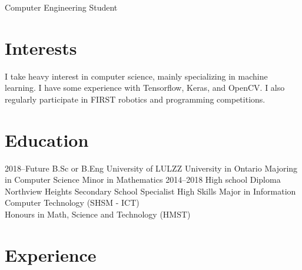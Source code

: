 \documentclass[]{chandan-cv}
\begin{document}
       {Computer Engineering Student}



\section{Interests}

I take heavy interest in computer science, mainly specializing in machine learning. I have some experience with Tensorflow, Keras, and OpenCV. I also regularly participate in FIRST robotics and programming competitions.

\section{Education}

\begin{entrylist}
  \entry
    {2018–Future}
    {B.Sc or B.Eng {\normalfont University of LULZZ}}
    {University in Ontario}
    {Majoring in Computer Science Minor in Mathematics}
  \entry
    {2014–2018}
    {High school Diploma}
    {Northview Heights Secondary School}
    {Specialist High Skills Major in Information Computer Technology (SHSM - ICT)\\
    Honours in Math, Science and Technology (HMST)}
\end{entrylist}

\section{Experience}
\end{document}
